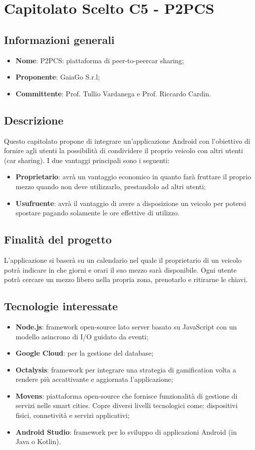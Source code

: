 \section{Capitolato Scelto C5 - P2PCS}
\subsection{Informazioni generali}
\begin{itemize}
\item \textbf{Nome}: P2PCS: piattaforma di peer-to-peer\glosp car sharing;
\item \textbf{Proponente}: GaiaGo S.r.l;
\item \textbf{Committente}: Prof. Tullio Vardanega e Prof. Riccardo Cardin.
\end{itemize}
\subsection{Descrizione}
Questo capitolato propone di integrare un'applicazione Android con l'obiettivo di fornire agli utenti la possibilità di condividere il proprio veicolo con altri utenti (car sharing). 
I due vantaggi principali sono i seguenti:
\begin{itemize}
	\item \textbf{Proprietario}: avrà un vantaggio economico in quanto farà fruttare il proprio mezzo quando non deve utilizzarlo, prestandolo ad altri utenti;
	\item \textbf{Usufruente}: avrà il vantaggio di avere a disposizione un veicolo per potersi spostare pagando solamente le ore effettive di utilizzo.
\end{itemize}
\subsection{Finalità del progetto}
L'applicazione si baserà su un calendario nel quale il proprietario di un veicolo potrà indicare in che giorni e orari il suo mezzo sarà disponibile. Ogni utente potrà cercare un mezzo libero nella propria zona, prenotarlo e ritirarne le chiavi.
\subsection{Tecnologie interessate}
\begin{itemize}
	\item \textbf{Node.js\glo}: framework\glo{} open-source lato server basato su JavaScript con un modello asincrono di I/O guidato da eventi;
	\item \textbf{Google Cloud}: per la gestione del database;
	\item \textbf{Octalysis}: framework\glo{} per integrare una strategia di gamification\glo{} volta a rendere più accattivante e aggiornata l'applicazione;
	\item \textbf{Movens}: piattaforma open-source\glo{} che fornisce funzionalità di gestione di servizi nelle smart cities. Copre diversi livelli tecnologici come: dispositivi fisici, connetività e servizi applicativi;	
	\item \textbf{Android Studio}: framework\glo{} per lo sviluppo di applicazioni Android (in Java o Kotlin).
\end{itemize}

